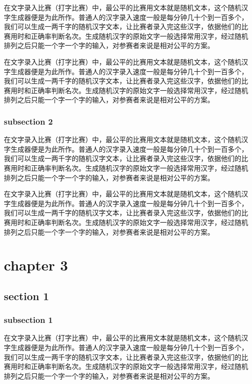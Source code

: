 \documentclass[12pt,hyperref,UTF8]{ctexbook}
\begin{document}
在文字录入比赛（打字比赛）中，最公平的比赛用文本就是随机文本，这个随机汉字生成器便是为此所作。普通人的汉字录入速度一般是每分钟几十个到一百多个，我们可以生成一两千字的随机汉字文本，让比赛者录入完这些汉字，依据他们的比赛用时和正确率判断名次。生成随机汉字的原始文字一般选择常用汉字，经过随机排列之后只能一个字一个字的输入，对参赛者来说是相对公平的方案。

在文字录入比赛（打字比赛）中，最公平的比赛用文本就是随机文本，这个随机汉字生成器便是为此所作。普通人的汉字录入速度一般是每分钟几十个到一百多个，我们可以生成一两千字的随机汉字文本，让比赛者录入完这些汉字，依据他们的比赛用时和正确率判断名次。生成随机汉字的原始文字一般选择常用汉字，经过随机排列之后只能一个字一个字的输入，对参赛者来说是相对公平的方案。

\subsection{subsection 2}

在文字录入比赛（打字比赛）中，最公平的比赛用文本就是随机文本，这个随机汉字生成器便是为此所作。普通人的汉字录入速度一般是每分钟几十个到一百多个，我们可以生成一两千字的随机汉字文本，让比赛者录入完这些汉字，依据他们的比赛用时和正确率判断名次。生成随机汉字的原始文字一般选择常用汉字，经过随机排列之后只能一个字一个字的输入，对参赛者来说是相对公平的方案。

在文字录入比赛（打字比赛）中，最公平的比赛用文本就是随机文本，这个随机汉字生成器便是为此所作。普通人的汉字录入速度一般是每分钟几十个到一百多个，我们可以生成一两千字的随机汉字文本，让比赛者录入完这些汉字，依据他们的比赛用时和正确率判断名次。生成随机汉字的原始文字一般选择常用汉字，经过随机排列之后只能一个字一个字的输入，对参赛者来说是相对公平的方案。

\cleardoublepage
\chapter{chapter 3}

\section{section 1}

\subsection{subsection 1}

在文字录入比赛（打字比赛）中，最公平的比赛用文本就是随机文本，这个随机汉字生成器便是为此所作。普通人的汉字录入速度一般是每分钟几十个到一百多个，我们可以生成一两千字的随机汉字文本，让比赛者录入完这些汉字，依据他们的比赛用时和正确率判断名次。生成随机汉字的原始文字一般选择常用汉字，经过随机排列之后只能一个字一个字的输入，对参赛者来说是相对公平的方案。
\end{document}
